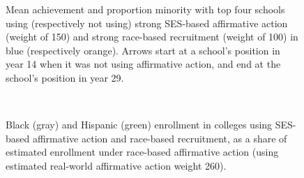 \begin{figure}
  \centering
  \caption{Mean achievement and proportion minority with top four schools using (respectively not using) strong SES-based affirmative action (weight of 150) and strong race-based recruitment (weight of 100) in \colorbox{sns-blue}{blue} (respectively \colorbox{sns-orange}{orange}). 
  Arrows start at a school's position in year 14 when it was not using affirmative action, and end at the school's position in year 29.}
  \label{fig:3a}
\end{figure}

\begin{figure}
  \centering
   \\
  \caption{Black (\colorbox{sns-gray}{gray}) and Hispanic (\colorbox{sns-green}{green}) enrollment in colleges using SES-based affirmative action and race-based recruitment, as a share of estimated enrollment under race-based affirmative action (using estimated real-world affirmative action weight 260).}
  \label{fig:2}
\end{figure}

